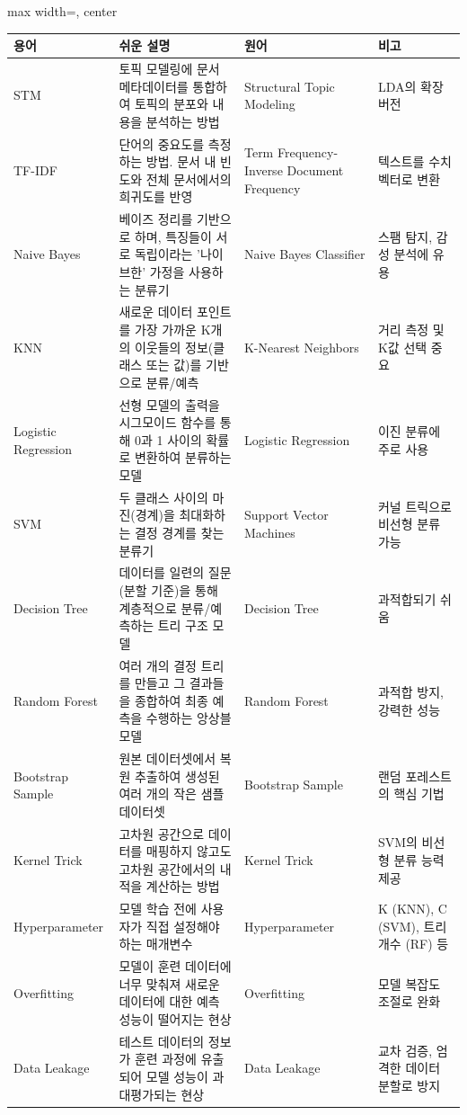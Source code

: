 \documentclass[11pt,a4paper]{article}
\theoremstyle{definition}
\begin{document}
\begin{adjustbox}{max width=\textwidth, center}
\begin{tabular}{llll}
\toprule
\textbf{용어} & \textbf{쉬운 설명} & \textbf{원어} & \textbf{비고} \\
\midrule
STM & 토픽 모델링에 문서 메타데이터를 통합하여 토픽의 분포와 내용을 분석하는 방법 & Structural Topic Modeling & LDA의 확장 버전 \\
TF-IDF & 단어의 중요도를 측정하는 방법. 문서 내 빈도와 전체 문서에서의 희귀도를 반영 & Term Frequency-Inverse Document Frequency & 텍스트를 수치 벡터로 변환 \\
Naive Bayes & 베이즈 정리를 기반으로 하며, 특징들이 서로 독립이라는 '나이브한' 가정을 사용하는 분류기 & Naive Bayes Classifier & 스팸 탐지, 감성 분석에 유용 \\
KNN & 새로운 데이터 포인트를 가장 가까운 K개의 이웃들의 정보(클래스 또는 값)를 기반으로 분류/예측 & K-Nearest Neighbors & 거리 측정 및 K값 선택 중요 \\
Logistic Regression & 선형 모델의 출력을 시그모이드 함수를 통해 0과 1 사이의 확률로 변환하여 분류하는 모델 & Logistic Regression & 이진 분류에 주로 사용 \\
SVM & 두 클래스 사이의 마진(경계)을 최대화하는 결정 경계를 찾는 분류기 & Support Vector Machines & 커널 트릭으로 비선형 분류 가능 \\
Decision Tree & 데이터를 일련의 질문(분할 기준)을 통해 계층적으로 분류/예측하는 트리 구조 모델 & Decision Tree & 과적합되기 쉬움 \\
Random Forest & 여러 개의 결정 트리를 만들고 그 결과들을 종합하여 최종 예측을 수행하는 앙상블 모델 & Random Forest & 과적합 방지, 강력한 성능 \\
Bootstrap Sample & 원본 데이터셋에서 복원 추출하여 생성된 여러 개의 작은 샘플 데이터셋 & Bootstrap Sample & 랜덤 포레스트의 핵심 기법 \\
Kernel Trick & 고차원 공간으로 데이터를 매핑하지 않고도 고차원 공간에서의 내적을 계산하는 방법 & Kernel Trick & SVM의 비선형 분류 능력 제공 \\
Hyperparameter & 모델 학습 전에 사용자가 직접 설정해야 하는 매개변수 & Hyperparameter & K (KNN), C (SVM), 트리 개수 (RF) 등 \\
Overfitting & 모델이 훈련 데이터에 너무 맞춰져 새로운 데이터에 대한 예측 성능이 떨어지는 현상 & Overfitting & 모델 복잡도 조절로 완화 \\
Data Leakage & 테스트 데이터의 정보가 훈련 과정에 유출되어 모델 성능이 과대평가되는 현상 & Data Leakage & 교차 검증, 엄격한 데이터 분할로 방지 \\

\end{tabular}
\end{adjustbox}
\end{document}
